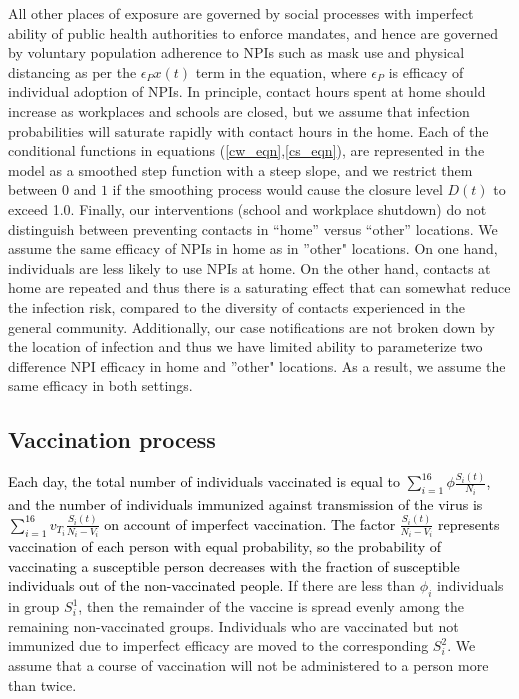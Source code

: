 All other places of exposure are governed by social processes with imperfect ability of public health authorities to enforce mandates, and hence are governed by voluntary population adherence to NPIs such as mask use and physical distancing as per the $\epsilon_P x(t)$ term in the equation, where $\epsilon_P$ is efficacy of individual adoption of NPIs.  In principle, contact hours spent at home should increase as workplaces and schools are closed, but we assume that infection probabilities will saturate rapidly with contact hours in the home. Each of the conditional functions in equations (\ref{cw_eqn},\ref{cs_eqn}), are represented in the model as a smoothed step function with a steep slope, and we restrict them between $0$ and $1$ if the smoothing process would cause the closure level $D(t)$ to exceed 1.0.   Finally, our interventions (school and workplace shutdown) do not distinguish between preventing contacts in “home” versus “other” locations. We assume the same efficacy of NPIs in home as in ''other" locations.  On one hand, individuals are less likely to use NPIs at home.  On the other hand, contacts at home are repeated and thus there is a saturating effect that can somewhat reduce the infection risk, compared to the diversity of contacts experienced in the general community.  Additionally, our case notifications are not broken down by the location of infection and thus we have limited ability to parameterize two difference NPI efficacy in home and ''other" locations.  As a result, we assume the same efficacy in both settings.

\subsection{Vaccination process}
 \textcolor{black}{Each day, the total number of individuals vaccinated is equal to $\sum_{i = 1}^{16} \phi \frac{S_i(t)}{N_i}$, and the number of individuals immunized against transmission of the virus is $\sum_{i = 1}^{16} v_{T_i} \frac{S_i(t)}{N_i - V_i}$ on account of imperfect vaccination. The factor $\frac{S_i(t)}{N_i - V_i}$ represents vaccination of each person with equal probability, so the probability of vaccinating a susceptible person decreases with the fraction of susceptible individuals out of the non-vaccinated people.} If there are less than $\phi_i$ individuals in group $S^1_i$, then the remainder of the vaccine is spread evenly among the remaining non-vaccinated groups. Individuals who are vaccinated but not immunized due to imperfect efficacy are moved to the corresponding $S^2_i$. We assume that a course of vaccination will not be administered to a person more than twice.

